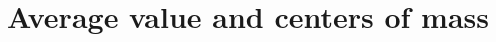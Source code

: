 \documentclass[../book/calcnotes.tex]{subfiles}
\begin{document}
\section{Average value and centers of mass}
\label{sec:integral.average-value}

\begin{exercises}
\end{exercises}
\end{document}
